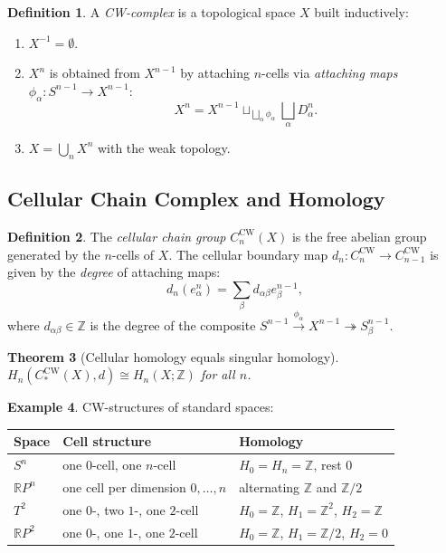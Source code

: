 \documentclass[12pt,a4paper]{amsart}
\newtheorem{theorem}{Theorem}[section]
\theoremstyle{definition}
\newtheorem{definition}[theorem]{Definition}
\newtheorem{example}[theorem]{Example}
\begin{document}
\begin{definition}
A \emph{CW-complex} is a topological space $X$ built inductively:
\begin{enumerate}[label=(\roman*)]
  \item $X^{-1} = \emptyset$.
  \item $X^n$ is obtained from $X^{n-1}$ by attaching $n$-cells via
    \emph{attaching maps} $\phi_\alpha\colon S^{n-1} \to X^{n-1}$:
    \[
      X^n = X^{n-1} \sqcup_{\bigsqcup_\alpha \phi_\alpha}
        \bigsqcup_\alpha D^n_\alpha.
    \]
  \item $X = \bigcup_n X^n$ with the weak topology.
\end{enumerate}
\end{definition}

\subsection{Cellular Chain Complex and Homology}

\begin{definition}
The \emph{cellular chain group} $C_n^{\mathrm{CW}}(X)$ is the free abelian group
generated by the $n$-cells of $X$.
The cellular boundary map $d_n\colon C_n^{\mathrm{CW}} \to C_{n-1}^{\mathrm{CW}}$
is given by the \emph{degree} of attaching maps:
\[
  d_n(e^n_\alpha) = \sum_\beta d_{\alpha\beta} e^{n-1}_\beta,
\]
where $d_{\alpha\beta} \in \mathbb{Z}$ is the degree of the composite
$S^{n-1} \xrightarrow{\phi_\alpha} X^{n-1} \twoheadrightarrow S^{n-1}_\beta$.
\end{definition}

\begin{theorem}[Cellular homology equals singular homology]
$H_n(C_*^{\mathrm{CW}}(X), d) \cong H_n(X;\mathbb{Z})$ for all $n$.
\end{theorem}

\begin{example}
CW-structures of standard spaces:
\begin{center}
\begin{tabular}{lll}
\toprule
Space & Cell structure & Homology \\
\midrule
$S^n$ & one $0$-cell, one $n$-cell & $H_0 = H_n = \mathbb{Z}$, rest $0$ \\
$\mathbb{R}P^n$ & one cell per dimension $0,\ldots,n$ & alternating $\mathbb{Z}$ and $\mathbb{Z}/2$ \\
$T^2$ & one $0$-, two $1$-, one $2$-cell & $H_0=\mathbb{Z}$, $H_1=\mathbb{Z}^2$, $H_2=\mathbb{Z}$ \\
$\mathbb{R}P^2$ & one $0$-, one $1$-, one $2$-cell & $H_0=\mathbb{Z}$, $H_1=\mathbb{Z}/2$, $H_2=0$ \\
\bottomrule
\end{tabular}
\end{center}
\end{example}
\end{document}
